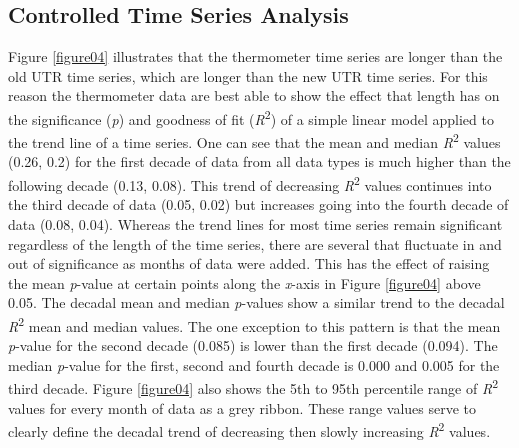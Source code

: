 \documentclass{ametsoc}
\begin{document}
\subsection{Controlled Time Series Analysis}
Figure \ref{figure04} illustrates that the thermometer time series are longer than the old UTR time series, which are longer than the new UTR time series. For this reason the thermometer data are best able to show the effect that length has on the significance (\emph{p}) and goodness of fit (\emph{R}\textsuperscript{2}) of a simple linear model applied to the trend line of a time series. One can see that the mean and median \emph{R}\textsuperscript{2} values (0.26, 0.2) for the first decade of data from all data types is much higher than the following decade (0.13, 0.08). This trend of decreasing \emph{R}\textsuperscript{2} values continues into the third decade of data (0.05, 0.02) but increases going into the fourth decade of data (0.08, 0.04). Whereas the trend lines for most time series remain significant regardless of the length of the time series, there are several that fluctuate in and out of significance as months of data were added. This has the effect of raising the mean \emph{p}-value at certain points along the \emph{x}-axis in Figure \ref{figure04} above 0.05. The decadal mean and median \emph{p}-values show a similar trend to the decadal \emph{R}\textsuperscript{2} mean and median values. The one exception to this pattern is that the mean \emph{p}-value for the second decade (0.085) is lower than the first decade (0.094). The median \emph{p}-value for the first, second and fourth decade is 0.000 and 0.005 for the third decade. Figure \ref{figure04} also shows the 5th to 95th percentile range of \emph{R}\textsuperscript{2} values for every month of data as a grey ribbon. These range values serve to clearly define the decadal trend of decreasing then slowly increasing \emph{R}\textsuperscript{2} values.
\end{document}
